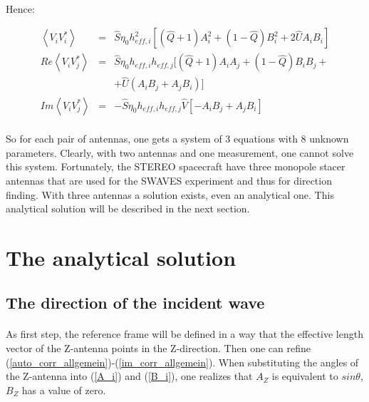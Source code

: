\documentclass[a4paper,10pt]{thesis}
\begin{document}
\paragraph*{}
Hence:

\begin{eqnarray}
\left\langle V_i V_i^{*} \right\rangle &=& \hat{S}\eta_0 h_{eff,i}^2[(\hat{Q}+1) A^2_i + (1-\hat{Q}) B^2_i+ 2 \hat{U}A_i B_i]  \label{auto_corr_allgemein}\\
Re \left\langle V_i V_j^{*}\right\rangle &=& \hat{S}\eta_0 h_{eff,i} h_{eff,j}[(\hat{Q}+1) A_i A_j + (1-\hat{Q}) B_i B_j + \label{re_corr_allgemein}\\
& & + \hat{U} (A_i B_j + A_j B_i)] \nonumber \\
Im \left\langle V_i V_j^{*}\right\rangle &=& -\hat{S}\eta_0 h_{eff,i} h_{eff,j} \hat{V}[-A_i B_j + A_j B_i ] \label{im_corr_allgemein}
\end{eqnarray}

\paragraph{}
So for each pair of antennas, one gets a system of 3 equations with 8 unknown parameters. Clearly, with two antennas and one measurement, one cannot solve this system. Fortunately, the STEREO spacecraft have three monopole stacer antennas that are used for the SWAVES experiment and thus for direction finding. With three antennas a solution exists, even an analytical one. This analytical solution will be described in the next section.

\section{\textbf{The analytical solution}}
\subsection{The direction of the incident wave}
\paragraph*{}
As first step, the reference frame will be defined in a way that the effective length vector of the Z-antenna points in the Z-direction. Then one can refine (\ref{auto_corr_allgemein})-(\ref{im_corr_allgemein}).  When substituting the angles of the Z-antenna into (\ref{A_i}) and (\ref{B_i}), one realizes that $A_Z$ is equivalent to $sin \theta$, $B_Z$ has a value of zero.
\end{document}
